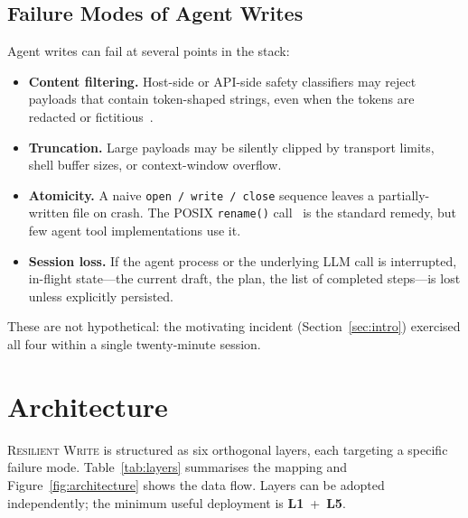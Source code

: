 \documentclass[11pt,twocolumn]{article}
\newcommand{\layer}[1]{\textbf{L#1}}
\begin{document}
\subsection{Failure Modes of Agent Writes}

Agent writes can fail at several points in the stack:

\begin{itemize}[nosep]
  \item \textbf{Content filtering.}  Host-side or API-side safety
    classifiers may reject payloads that contain token-shaped
    strings, even when the tokens are redacted or
    fictitious~\cite{pilkington2023leaking}.
  \item \textbf{Truncation.}  Large payloads may be silently
    clipped by transport limits, shell buffer sizes, or
    context-window overflow.
  \item \textbf{Atomicity.}  A naive \texttt{open\,/\,write\,/\,close}
    sequence leaves a partially-written file on crash.
    The POSIX \texttt{rename()} call~\cite{posix2017rename} is the
    standard remedy, but few agent tool implementations use it.
  \item \textbf{Session loss.}  If the agent process or the
    underlying LLM call is interrupted, in-flight state---the
    current draft, the plan, the list of completed steps---is
    lost unless explicitly persisted.
\end{itemize}

These are not hypothetical: the motivating incident
(Section~\ref{sec:intro}) exercised all four within a single
twenty-minute session.

\section{Architecture}
\label{sec:architecture}

\textsc{Resilient Write} is structured as six orthogonal layers,
each targeting a specific failure mode.  Table~\ref{tab:layers}
summarises the mapping and Figure~\ref{fig:architecture} shows the
data flow.  Layers can be adopted independently; the minimum useful
deployment is \layer{1}~+~\layer{5}.
\end{document}
